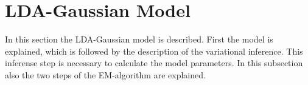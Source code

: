 % 
%  
% 
% 

\section{LDA-Gaussian Model}
In this section the LDA-Gaussian model is described. First the model is explained, which is followed by the description of the variational inference. This inferense step is necessary to calculate the model parameters. In this subsection also the two steps of the EM-algorithm are explained.



